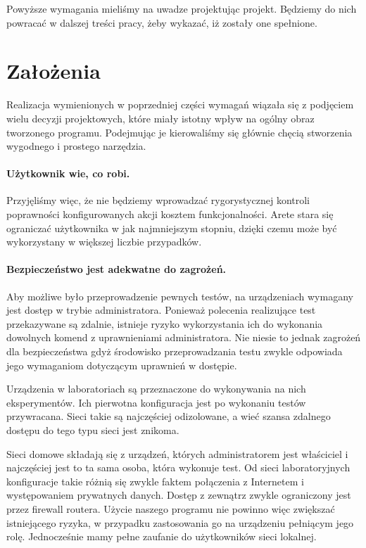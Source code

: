 \documentclass[00-praca-magisterska.tex]{subfiles}
\begin{document}
Powyższe wymagania mieliśmy na uwadze projektując projekt. Będziemy do nich
powracać w dalszej treści pracy, żeby wykazać, iż zostały one spełnione.

\section{Założenia}

Realizacja wymienionych w poprzedniej części wymagań wiązała się z podjęciem
wielu decyzji projektowych, które miały istotny wpływ na ogólny obraz tworzonego
programu.  Podejmując je kierowaliśmy się głównie chęcią stworzenia wygodnego i
prostego narzędzia.

\paragraph{Użytkownik wie, co robi.} Przyjęliśmy więc, że nie będziemy
wprowadzać rygorystycznej kontroli poprawności konfigurowanych akcji kosztem
funkcjonalności. Arete stara się ograniczać użytkownika w jak najmniejszym stopniu,
dzięki czemu może być wykorzystany w większej liczbie przypadków.

\paragraph{Bezpieczeństwo jest adekwatne do zagrożeń.} Aby możliwe było
przeprowadzenie pewnych testów, na urządzeniach wymagany jest dostęp w trybie
administratora. Ponieważ polecenia realizujące test przekazywane są zdalnie,
istnieje ryzyko wykorzystania ich do wykonania dowolnych komend z uprawnieniami
administratora. Nie niesie to jednak zagrożeń dla bezpieczeństwa gdyż środowisko
przeprowadzania testu zwykle odpowiada jego wymaganiom dotyczącym uprawnień w
dostępie.

Urządzenia w laboratoriach są przeznaczone do wykonywania na nich
eksperymentów.  Ich pierwotna konfiguracja jest po wykonaniu testów
przywracana. Sieci takie są najczęściej odizolowane, a wieć szansa zdalnego
dostępu do tego typu sieci jest znikoma.

Sieci domowe składają się z urządzeń, których administratorem jest właściciel i
najczęściej jest to ta sama osoba, która wykonuje test. Od sieci laboratoryjnych
konfiguracje takie różnią się zwykle faktem połączenia z Internetem i
występowaniem prywatnych danych. Dostęp z zewnątrz zwykle ograniczony jest przez
firewall routera. Użycie naszego programu nie powinno więc zwiększać
istniejącego ryzyka, w przypadku zastosowania go na urządzeniu pełniącym jego
rolę. Jednocześnie mamy pełne zaufanie do użytkowników sieci lokalnej.
\end{document}
